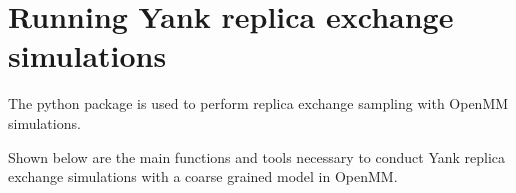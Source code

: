 \documentclass[letterpaper,12pt,english,openany,oneside]{sphinxmanual}
\begin{document}
\newpage


\section{Running Yank replica exchange simulations}
\label{\detokenize{simulation:running-yank-replica-exchange-simulations}}
The  python package is used to perform replica exchange sampling with OpenMM simulations.

Shown below are the main functions and tools necessary to conduct Yank replica exchange simulations with a coarse grained model in OpenMM.

\label{\detokenize{simulation:module-simulation.rep_exch}}
\end{document}
